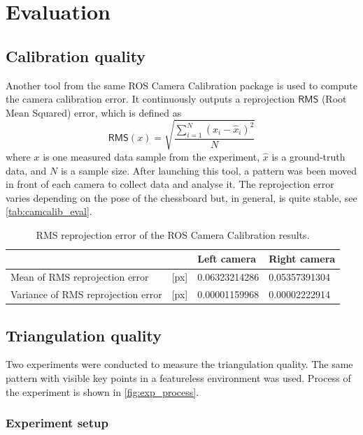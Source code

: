 \chapter{Evaluation}
\label{chapter:evaluation}

\section{Calibration quality}
Another tool from the same ROS Camera Calibration package is used to compute the camera calibration error.
It continuously outputs a reprojection $\mathsf{RMS}$ (Root Mean Squared) error, which is defined as
\begin{equation}
    \mathsf{RMS}(x) = \sqrt{\frac{\sum_{i=1}^{N}{(x_i - \hat{x}_i)^2}}{N}}
\end{equation}
where $x$ is one measured data sample from the experiment, $\hat{x}$ is a ground-truth data, and $N$ is a sample size.
After launching this tool, a pattern was been moved in front of each camera to collect data and analyse it.
The reprojection error varies depending on the pose of the chessboard but, in general, is quite stable, see \autoref{tab:camcalib_eval}.

\begin{table}[ht]
    \begin{center}
      \begin{tabular}{ ll l l }
      \hline
      && Left camera & Right camera \\ \hline
      Mean of RMS reprojection error & [px] & 0.06323214286 & 0.05357391304 \\
      Variance of RMS reprojection error & [px] & 0.00001159968 & 0.00002222914 \\
      \end{tabular}
    \end{center}
    \caption{RMS reprojection error of the ROS Camera Calibration results.}
    \label{tab:camcalib_eval}
\end{table}

\section{Triangulation quality}
Two experiments were conducted to measure the triangulation quality.
The same pattern with visible key points in a featureless environment was used.
Process of the experiment is shown in \autoref{fig:exp_process}.

\subsection{Experiment setup}
\label{sec:eval_setup}

